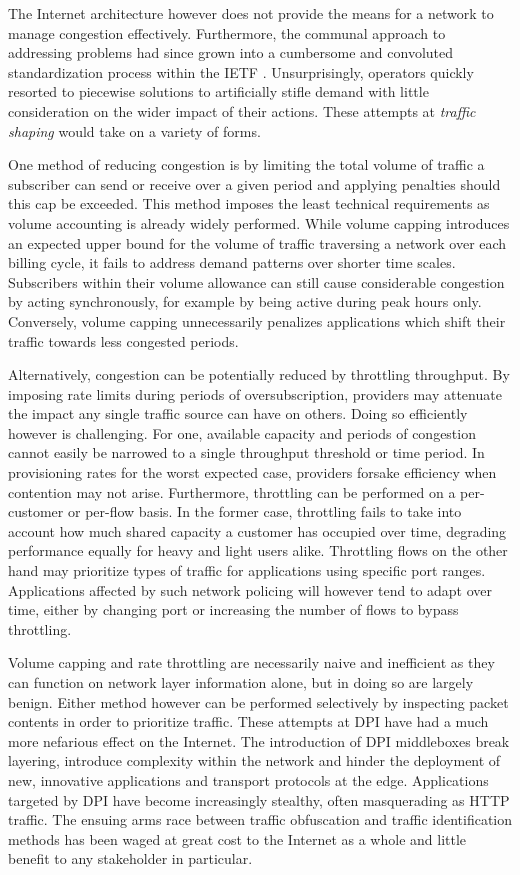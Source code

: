 The Internet architecture however does not provide the means for a network to manage congestion effectively.
Furthermore, the communal approach to addressing problems had since grown into a cumbersome and convoluted standardization process within the \ac{IETF} \cite{Bush:2005p476}.
Unsurprisingly, operators quickly resorted to piecewise solutions to artificially stifle demand with little consideration on the wider impact of their actions. These attempts at \emph{traffic shaping} would take on a variety of forms.

One method of reducing congestion is by limiting the total volume of traffic a subscriber can send or receive over a given period and applying penalties should this cap be exceeded.
This method imposes the least technical requirements as volume accounting is already widely performed.
While volume capping introduces an expected upper bound for the volume of traffic traversing a network over each billing cycle, it fails to address demand patterns over shorter time scales.
Subscribers within their volume allowance can still cause considerable congestion by acting synchronously, for example by being active during peak hours only. 
Conversely, volume capping unnecessarily penalizes applications which shift their traffic towards less congested periods. 

Alternatively, congestion can be potentially reduced by throttling throughput. 
By imposing rate limits during periods of oversubscription, providers may attenuate the impact any single traffic source can have on others.
Doing so efficiently however is challenging.
For one, available capacity and periods of congestion cannot easily be narrowed to a single throughput threshold or time period.
In provisioning rates for the worst expected case, providers forsake efficiency when contention may not arise.
Furthermore, throttling can be performed on a per-customer or per-flow basis.
In the former case, throttling fails to take into account how much shared capacity a customer has occupied over time, degrading performance equally for heavy and light users alike.
Throttling flows on the other hand may prioritize types of traffic for applications using specific port ranges. 
Applications affected by such network policing will however tend to adapt over time, either by changing port or increasing the number of flows to bypass throttling.

Volume capping and rate throttling are necessarily naive and inefficient as they can function on network layer information alone, but in doing so are largely benign.
Either method however can be performed selectively by inspecting packet contents in order to prioritize traffic.
These attempts at \ac{DPI} have had a much more nefarious effect on the Internet.
The introduction of \ac{DPI} middleboxes break layering, introduce complexity within the network and hinder the deployment of new, innovative applications and transport protocols at the edge.
Applications targeted by \ac{DPI} have become increasingly stealthy, often masquerading as \ac{HTTP} traffic.
The ensuing arms race between traffic obfuscation and traffic identification methods has been waged at great cost to the Internet as a whole and little benefit to any stakeholder in particular.

